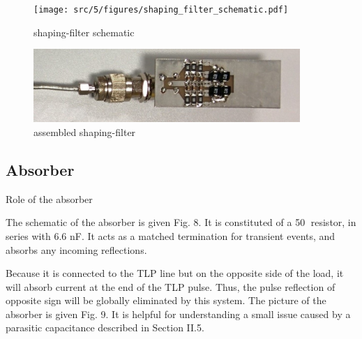 \begin{figure}[!h]
  \centering
  \texttt{[image: src/5/figures/shaping\_filter\_schematic.pdf]}
  \caption{shaping-filter schematic}
  \label{fig:shaping_filter_schematic}
\end{figure}

\begin{figure}[!h]
  \centering
  \includegraphics[width=0.9\textwidth]{src/5/figures/filter.jpg}
  \caption{assembled shaping-filter}
  \label{pic:shaping_filter_assembled}
\end{figure}


\subsection{Absorber}

Role of the absorber

The schematic of the absorber is given Fig. 8.
It is constituted of a 50 resistor, in series with 6.6 nF.
It acts as a matched termination for transient events, and absorbs any incoming reflections.


Because it is connected to the TLP line but on the opposite side of the load, it will absorb current at the end of the TLP pulse.
Thus, the pulse reflection of opposite sign will be globally eliminated by this system.
The picture of the absorber is given Fig. 9.
It is helpful for understanding a small issue caused by a parasitic capacitance described in Section II.5.

